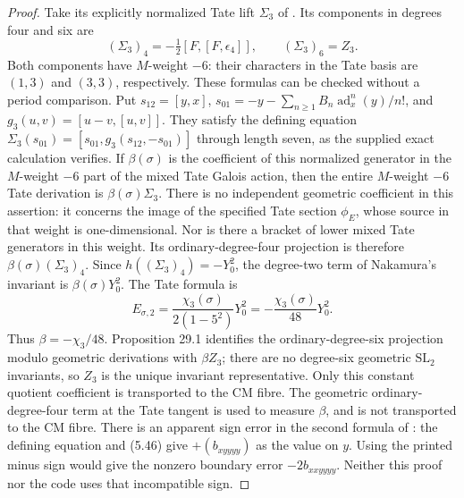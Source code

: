 \begin{proof}
Take its explicitly normalized Tate lift $\Sigma_3$ of
\citet[(5.41), (5.46), and (5.47)]{DorigoniEtAl2026}. Its components
in degrees four and six are
\[
        (\Sigma_3)_4=-\tfrac12[F,[F,\epsilon_4]],
        \qquad (\Sigma_3)_6=Z_3.
\]
Both components have $M$-weight $-6$: their characters in the Tate
basis are $(1,3)$ and $(3,3)$, respectively. These formulas can be
checked without a period comparison.
Put $s_{12}=[y,x]$, $s_{01}=-y-\sum_{n\ge1}B_n
\operatorname{ad}_x^n(y)/n!$, and $g_3(u,v)=[u-v,[u,v]]$.
They satisfy the defining equation
$\Sigma_3(s_{01})=[s_{01},g_3(s_{12},-s_{01})]$
through length seven, as the supplied exact calculation verifies.
If $\beta(\sigma)$ is the coefficient of this normalized generator
in the $M$-weight $-6$ part of the mixed Tate Galois action, then
the entire $M$-weight $-6$ Tate derivation is
$\beta(\sigma)\Sigma_3$. There is no independent geometric
coefficient in this assertion: it concerns the image of the
specified Tate section $\phi_E$, whose source in that weight is
one-dimensional. Nor is there a bracket of lower mixed Tate
generators in this weight. Its ordinary-degree-four projection is
therefore $\beta(\sigma)(\Sigma_3)_4$.
Since $h((\Sigma_3)_4)=-Y_0^2$, the degree-two term of Nakamura's
invariant is $\beta(\sigma)Y_0^2$. The Tate formula
\citet[Theorem 5.2.6]{Nakamura2013Eisenstein} is
\[
       E_{\sigma,2}=\frac{\chi_3(\sigma)}{2(1-5^2)}Y_0^2
                     =-\frac{\chi_3(\sigma)}{48}Y_0^2.
\]
Thus $\beta=-\chi_3/48$. Proposition 29.1 identifies the
ordinary-degree-six projection modulo geometric derivations with
$\beta Z_3$; there are no degree-six geometric $\mathrm{SL}_2$
invariants, so $Z_3$ is the unique invariant representative.
Only this constant quotient coefficient is transported to the CM
fibre. The geometric ordinary-degree-four term at the Tate
tangent is used to measure $\beta$, and is not transported to
the CM fibre.
There is an apparent sign error in the second formula of
\citep[(5.53)]{DorigoniEtAl2026}: the defining equation and (5.46)
give $+(b_{xyyyy})$ as the value on $y$. Using the printed minus
sign would give the nonzero boundary error $-2b_{xxyyyy}$.
Neither this proof nor the code uses that incompatible sign.


\end{proof}
